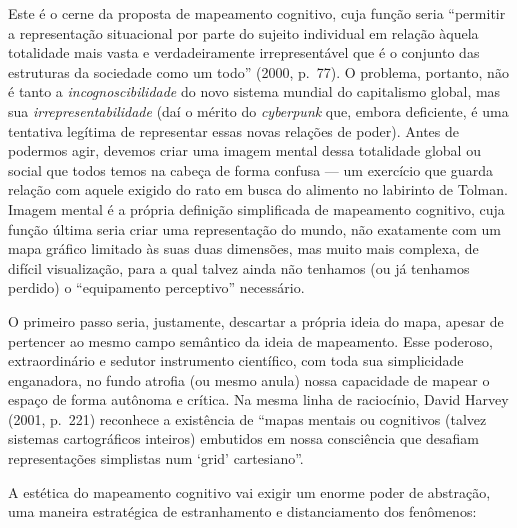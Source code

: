 Este é o cerne da proposta de mapeamento cognitivo, cuja função seria
``permitir a representação situacional por parte do sujeito individual
em relação àquela totalidade mais vasta e verdadeiramente
irrepresentável que é o conjunto das estruturas da sociedade como um
todo'' (2000, p.~77). O problema, portanto, não é tanto a
\emph{incognoscibilidade} do novo sistema mundial do capitalismo global,
mas sua \emph{irrepresentabilidade} (daí o mérito do \emph{cyberpunk}
que, embora deficiente, é uma tentativa legítima de representar essas
novas relações de poder). Antes de podermos agir, devemos criar uma
imagem mental dessa totalidade global ou social que todos temos na
cabeça de forma confusa --- um exercício que guarda relação com aquele
exigido do rato em busca do alimento no labirinto de Tolman. Imagem
mental é a própria definição simplificada de mapeamento cognitivo, cuja
função última seria criar uma representação do mundo, não exatamente com um mapa gráfico limitado às suas duas dimensões, mas muito mais complexa, de difícil visualização, para a qual talvez ainda não tenhamos (ou já tenhamos perdido) o ``equipamento perceptivo'' necessário.


O primeiro passo seria, justamente, descartar a própria ideia do mapa,
apesar de pertencer ao mesmo campo semântico da ideia de mapeamento.
Esse poderoso, extraordinário e sedutor instrumento científico, com toda
sua simplicidade enganadora, no fundo atrofia (ou mesmo anula) nossa
capacidade de mapear o espaço de forma autônoma e crítica. Na mesma
linha de raciocínio, David Harvey (2001, p.~221) reconhece a existência
de ``mapas mentais ou cognitivos (talvez sistemas cartográficos
inteiros) embutidos em nossa consciência que desafiam representações
simplistas num `grid' cartesiano''.

A estética do mapeamento cognitivo vai exigir um enorme poder de
abstração, uma maneira estratégica de estranhamento e distanciamento dos
fenômenos:

